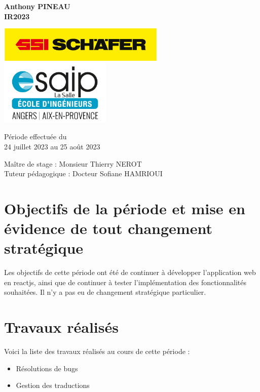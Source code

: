 \documentclass[a4paper, 12pt, french]{article}
\newcommand{\bdot}{\item[\color{ssiYellow}\ding{108}]}
\begin{document}
\begin{titlepage}
\begin{center}
			\textbf{Anthony PINEAU}\\
			\textbf{IR2023}

			\vfill

			\includegraphics[width=0.6\textwidth]{../images/schaefer.jpg}
			\vfill
			\includegraphics[width=0.4\textwidth]{../images/esaip.jpg}

			\vfill

			Période effectuée du\\
			24 juillet 2023 au 25 août 2023

			\vspace{0.8cm}
			
			\Large
			Maître de stage : Monsieur Thierry NEROT\\
			Tuteur pédagogique : Docteur Sofiane HAMRIOUI\\
		\end{center}
	\end{titlepage}
		
	\newpage
	
	\doublespacing
	\tableofcontents
	
	\listoffigures
	
	\newpage
		
	
	\singlespacing

	\section{Objectifs de la période et mise en évidence de tout changement stratégique}
		Les objectifs de cette période ont été de continuer à développer l'application web en reactjs, ainsi que de continuer à tester l'implémentation des fonctionnalités souhaitées. Il n'y a pas eu de changement stratégique particulier.

	\section{Travaux réalisés}
		Voici la liste des travaux réalisés au cours de cette période :
		\begin{itemize}
			\bdot{Résolutions de bugs}
			\bdot{Gestion des traductions}
		\end{itemize}		
\end{document}
